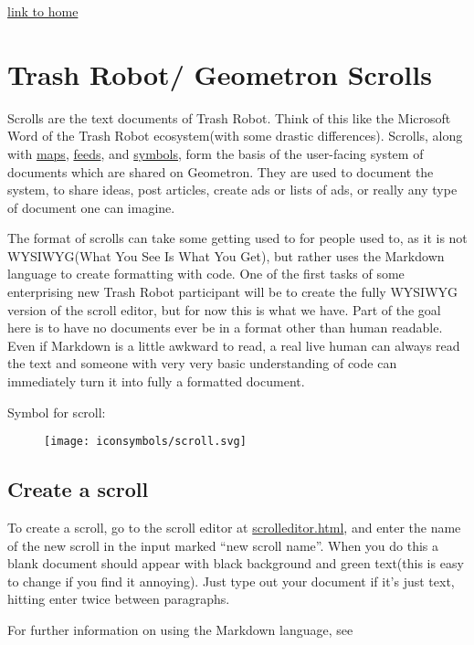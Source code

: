 \href{index.html}{link to home}

\section{Trash Robot/ Geometron
Scrolls}\label{trash-robot-geometron-scrolls}

Scrolls are the text documents of Trash Robot. Think of this like the
Microsoft Word of the Trash Robot ecosystem(with some drastic
differences). Scrolls, along with \href{scrolls/maps.md}{maps},
\href{scrolls/feeds.md}{feeds}, and \href{scrolls/symbols.md}{symbols},
form the basis of the user-facing system of documents which are shared
on Geometron. They are used to document the system, to share ideas, post
articles, create ads or lists of ads, or really any type of document one
can imagine.

The format of scrolls can take some getting used to for people used to,
as it is not WYSIWYG(What You See Is What You Get), but rather uses the
Markdown language to create formatting with code. One of the first tasks
of some enterprising new Trash Robot participant will be to create the
fully WYSIWYG version of the scroll editor, but for now this is what we
have. Part of the goal here is to have no documents ever be in a format
other than human readable. Even if Markdown is a little awkward to read,
a real live human can always read the text and someone with very very
basic understanding of code can immediately turn it into fully a
formatted document.

Symbol for scroll:

\begin{figure}[htbp]
\centering
\texttt{[image: iconsymbols/scroll.svg]}
\caption{}
\end{figure}

\subsection{Create a scroll}\label{create-a-scroll}

To create a scroll, go to the scroll editor at \url{scrolleditor.html},
and enter the name of the new scroll in the input marked ``new scroll
name''. When you do this a blank document should appear with black
background and green text(this is easy to change if you find it
annoying). Just type out your document if it's just text, hitting enter
twice between paragraphs.

For further information on using the Markdown language, see

